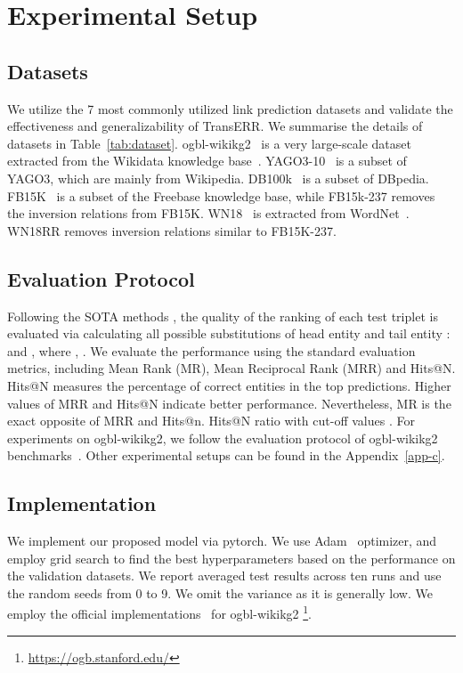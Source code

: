 \documentclass[11pt]{article}
\begin{document}
\section{Experimental Setup}


\subsection{Datasets}
We utilize the 7 most commonly utilized link prediction datasets and validate the effectiveness and generalizability of TransERR. We summarise the details of datasets in Table~\ref{tab:dataset}. ogbl-wikikg2~\cite{hu2020open} is a very large-scale dataset extracted from the Wikidata knowledge base~\cite{10.1145/2629489}. YAGO3-10~\cite{6suchanek2007yago} is a subset of YAGO3, which are mainly from Wikipedia. DB100k~\cite{63ding2018improving} is a subset of DBpedia. FB15K~\cite{7bordes2013translating} is a subset of the Freebase knowledge base, while {FB15k-237} \cite{36toutanova2015observed} removes the inversion relations from FB15K. {WN18}~\cite{7bordes2013translating} is extracted from WordNet~\cite{5miller1995wordnet}. {WN18RR} \cite{11dettmers2018convolutional} removes inversion relations similar to FB15K-237.






\subsection{Evaluation Protocol}

Following the SOTA methods \cite{31sun2019rotate,52chao2020pairre}, the quality of the ranking of each test triplet is evaluated via calculating all possible substitutions of head entity and tail entity :  and , where , . We evaluate the performance using the standard evaluation metrics, including Mean Rank (MR), Mean Reciprocal Rank (MRR) and Hits@N. Hits@N measures the percentage of correct entities in the top  predictions. Higher values of MRR and Hits@N indicate better performance. Nevertheless, MR is the exact opposite of MRR and Hits@n. Hits@N ratio with cut-off values . For experiments on ogbl-wikikg2, we follow the evaluation protocol of ogbl-wikikg2 benchmarks~\cite{hu2020open}. Other experimental setups can be found in the Appendix~\ref{app-c}.



\subsection{Implementation} 
We implement our proposed model via pytorch. We use Adam~\cite{adam} optimizer, and employ grid search to find the best hyperparameters based on the performance on the validation datasets. We report averaged test results across ten runs and use the random seeds from 0 to 9. We omit the variance as it is generally low.  We employ the official implementations~\cite{hu2020open} for ogbl-wikikg2 \footnote{\url{https://ogb.stanford.edu/}}. 
\end{document}
